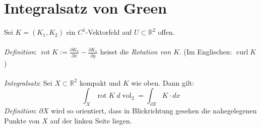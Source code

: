 \documentclass[12pt,a4paper,titlepage]{article}
\renewcommand{\d}{\partial}
\newcommand{\setR}{\mathbb{R}}
\newcommand{\vol}{\operatorname{vol}}
\newcommand{\rot}{\operatorname{rot}}
\begin{document}
\section*{Integralsatz von Green}
Sei $K=(K_1,K_2)$ ein $C^1$-Vektorfeld auf $U\subset\setR^2$ offen. \\
\\
\textit{Definition}: $\rot K:=\frac{\d K_2}{\d x}-\frac{\d K_1}{\d y}$ heisst die \emph{Rotation von $K$}. (Im Englischen: $\operatorname{curl}K$) \\
\\
\textit{Integralsatz}: Sei $X\subset\setR^2$ kompakt und $K$ wie oben. Dann gilt:
$$\int_X\rot K \;d\vol_2 = \int_{\d X}K\cdot dx$$
\textit{Definition}: $\d X$ wird so orientiert, dass in Blickrichtung gesehen die nahegelegenen Punkte von $X$ auf der linken Seite liegen.
\end{document}
